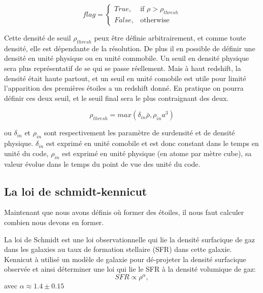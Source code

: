 \begin{equation}
	flag = 
  \begin{cases}
      True, & \text{if } \rho > \rho_{thresh}\\
      False,              & \text{otherwise}
  \end{cases}
\end{equation} 

Cette densité de seuil $\rho_{thresh}$ peux être définie arbitrairement, et comme toute densité, elle est dépendante de la résolution.
De plus il en possible de définir une densité en unité physique ou en unité commobile.
Un seuil en densité physique sera plus représentatif de se qui se passe réellement.
Mais à haut redshift, la densité était haute partout, et un seuil en unité comobile est utile pour limité l'apparition des premières étoiles a un redshift donné.
En pratique on pourra définir ces deux seuil, et le seuil final sera le plus contraignant des deux.


\begin{equation}
	\rho_{thresh} = max\left(  \delta_{in} \bar{\rho}, \rho_{in} a^3 \right)
\end{equation} 

ou $\delta_{in}$ et $\rho_{in}$  sont respectivement les paramètre de surdensité et de densité physique.
$\delta_{in}$ est exprimé en unité comobile et est donc constant dans le temps en unité du code,
 $\rho_{in}$ est exprimé en unité physique (en atome par mètre cube), sa valeur évolue dans le temps du point de vue des unité du code.


\subsection{La loi de schmidt-kennicut}

Maintenant que nous avons définis où former des étoiles, il nous faut calculer combien nous devons en former.

La loi de Schmidt \citep{1959ApJ...129..243S}  est une loi observationnelle qui lie la densité surfacique de gaz dans les galaxies au taux de formation stellaire (\ac{SFR}) dans cette galaxie.
Kennicut \citep{1998ApJ...498..541K} à utilisé un modèle de galaxie pour dé-projeter la densité surfacique observée et ainsi déterminer une loi qui lie le \ac{SFR} à la densité volumique de gaz:
\begin{equation}
SFR \propto \rho ^{\alpha},
\end{equation}
avec $\alpha \approx 1.4 \pm 0.15$

